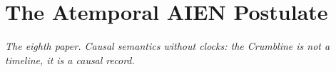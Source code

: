 \documentclass[11pt,letterpaper]{article}
\begin{document}
\section*{The Atemporal AIEN Postulate}
\begin{center}\textit{The eighth paper. Causal semantics without clocks: the Crumbline is not a timeline, it is a causal record.}\end{center}
\newpage

\end{document}
